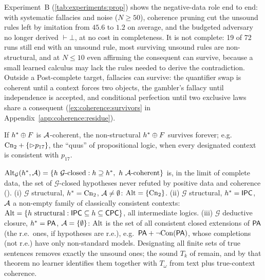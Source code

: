 Experiment~B (\cref{tab:experiments:prop}) shows the negative-data role end to end: with systematic fallacies and noise ($N\ge50$), coherence pruning cut the unsound rules left by imitation from $45.6$ to $1.2$ on average, and the budgeted adversary no longer derived $\vdash\bot$, at no cost in completeness. It is not complete: 19 of 72 runs still end with an unsound rule, most surviving unsound rules are non-structural, and at $N\le10$ even affirming the consequent can survive, because a small learned calculus may lack the rules needed to derive the contradiction. Outside a Post-complete target, fallacies can survive: the quantifier swap is coherent until a context forces two objects, the gambler's fallacy until independence is accepted, and conditional perfection until two exclusive laws share a consequent (\cref{ex:coherence:survivors} in Appendix~\ref{app:coherence:residue}).

\begin{proposition}\label{prop:coherence:quus}
If $h^{*}\oplus F$ is $\mathcal{A}$-coherent, the non-structural $h^{*}\oplus F$ survives forever; e.g.\ $\mathrm{Cn}_2+\{\rhd p_{17}\}$, the ``quus'' of propositional logic, when every designated context is consistent with $p_{17}$.
\end{proposition}

\begin{theorem}\label{thm:coherence:residue}
$\mathrm{Alt}_{\mathcal G}(h^{*},\mathcal{A})=\{h\ \mathcal G\text{-closed}:h\supseteq h^{*},\ h\ \mathcal{A}\text{-coherent}\}$ is, in the limit of complete data, the set of $\mathcal G$-closed hypotheses never refuted by positive data and coherence ().
\textup{(i)} $\mathcal G$ structural, $h^{*}=\mathrm{Cn}_2$, $\mathcal{A}\neq\emptyset$: $\mathrm{Alt}=\{\mathrm{Cn}_2\}$.
\textup{(ii)} $\mathcal G$ structural, $h^{*}=\mathsf{IPC}$, $\mathcal{A}$ a non-empty family of classically consistent contexts: $\mathrm{Alt}=\{h\text{ structural}:\mathsf{IPC}\subseteq h\subseteq\mathsf{CPC}\}$, all intermediate logics.
\textup{(iii)} $\mathcal G$ deductive closure, $h^{*}=\mathsf{PA}$, $\mathcal{A}=\{\emptyset\}$: $\mathrm{Alt}$ is the set of all consistent closed extensions of $\mathsf{PA}$ (the r.e.\ ones, if hypotheses are r.e.), e.g.\ $\mathsf{PA}+\neg\mathrm{Con}(\mathsf{PA})$, whose completions (not r.e.) have only non-standard models. Designating all finite sets of true sentences removes exactly the unsound ones; the sound $T_k$ of  remain, and by that theorem no learner identifies them together with $T_\omega$ from text plus true-context coherence.
\end{theorem}

